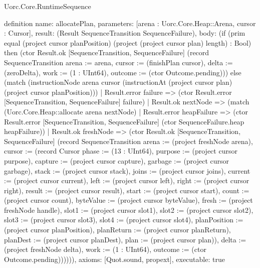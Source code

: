 \begin{lexlean}{Uorc.Core.RuntimeSequence}
\begin{semanticmodule}
definition{
  name: allocatePlan,
  parameters: [arena : Uorc.Core.Heap::Arena, cursor : Cursor],
  result: (Result SequenceTransition SequenceFailure),
  body: (if (prim equal (project cursor planPosition) (project (project cursor plan) length) : Bool) then (ctor Result.ok [SequenceTransition, SequenceFailure] (record SequenceTransition {arena := arena, cursor := (finishPlan cursor), delta := (zeroDelta), work := (1 : UInt64), outcome := (ctor Outcome.pending)})) else (match (instructionNode arena cursor (instructionAt (project cursor plan) (project cursor planPosition)))
    | Result.error failure => (ctor Result.error [SequenceTransition, SequenceFailure] failure)
    | Result.ok nextNode => (match (Uorc.Core.Heap::allocate arena nextNode)
      | Result.error heapFailure => (ctor Result.error [SequenceTransition, SequenceFailure] (ctor SequenceFailure.heap heapFailure))
      | Result.ok freshNode => (ctor Result.ok [SequenceTransition, SequenceFailure] (record SequenceTransition {arena := (project freshNode arena), cursor := (record Cursor {phase := (13 : UInt64), purpose := (project cursor purpose), capture := (project cursor capture), garbage := (project cursor garbage), stack := (project cursor stack), joins := (project cursor joins), current := (project cursor current), left := (project cursor left), right := (project cursor right), result := (project cursor result), start := (project cursor start), count := (project cursor count), byteValue := (project cursor byteValue), fresh := (project freshNode handle), slot1 := (project cursor slot1), slot2 := (project cursor slot2), slot3 := (project cursor slot3), slot4 := (project cursor slot4), planPosition := (project cursor planPosition), planReturn := (project cursor planReturn), planDest := (project cursor planDest), plan := (project cursor plan)}), delta := (project freshNode delta), work := (1 : UInt64), outcome := (ctor Outcome.pending)}))))),
  axioms: [Quot.sound, propext],
  executable: true
}


\end{semanticmodule}
\end{lexlean}
